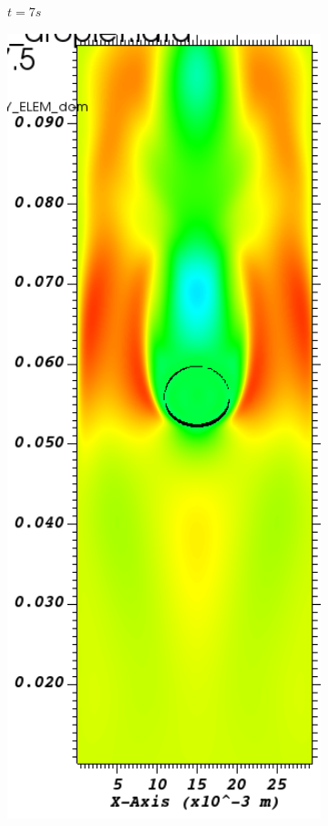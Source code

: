 \begin{figure}[H]
\begin{subfigure}[ht!]{0.18\textwidth}
		\caption{$t=7s$}
	\end{subfigure}
	\begin{subfigure}[ht!]{0.18\textwidth}
		\centering
		\includegraphics[width=1\textwidth]{fig_plateau_vitesse2/visit0016.png}

\end{subfigure}
\end{figure}
